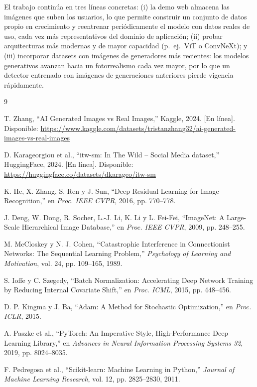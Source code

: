 \documentclass[conference]{IEEEtran}
\begin{document}
El trabajo continúa en tres líneas concretas: (i) la demo web almacena las imágenes que suben los usuarios, lo que permite construir un conjunto de datos propio en crecimiento y reentrenar periódicamente el modelo con datos reales de uso, cada vez más representativos del dominio de aplicación; (ii) probar arquitecturas más modernas y de mayor capacidad (p.\ ej.\ ViT o ConvNeXt); y (iii) incorporar datasets con imágenes de generadores más recientes: los modelos generativos avanzan hacia un fotorrealismo cada vez mayor, por lo que un detector entrenado con imágenes de generaciones anteriores pierde vigencia rápidamente.

\begin{thebibliography}{9}

T. Zhang, ``AI Generated Images vs Real Images,'' Kaggle, 2024. [En línea]. Disponible: \url{https://www.kaggle.com/datasets/tristanzhang32/ai-generated-images-vs-real-images}

D. Karageorgiou et al., ``itw-sm: In The Wild -- Social Media dataset,'' HuggingFace, 2024. [En línea]. Disponible: \url{https://huggingface.co/datasets/dkarageo/itw-sm}

K. He, X. Zhang, S. Ren y J. Sun, ``Deep Residual Learning for Image Recognition,'' en \emph{Proc. IEEE CVPR}, 2016, pp. 770--778.

J. Deng, W. Dong, R. Socher, L.-J. Li, K. Li y L. Fei-Fei, ``ImageNet: A Large-Scale Hierarchical Image Database,'' en \emph{Proc. IEEE CVPR}, 2009, pp. 248--255.

M. McCloskey y N. J. Cohen, ``Catastrophic Interference in Connectionist Networks: The Sequential Learning Problem,'' \emph{Psychology of Learning and Motivation}, vol. 24, pp. 109--165, 1989.

S. Ioffe y C. Szegedy, ``Batch Normalization: Accelerating Deep Network Training by Reducing Internal Covariate Shift,'' en \emph{Proc. ICML}, 2015, pp. 448--456.

D. P. Kingma y J. Ba, ``Adam: A Method for Stochastic Optimization,'' en \emph{Proc. ICLR}, 2015.

A. Paszke et al., ``PyTorch: An Imperative Style, High-Performance Deep Learning Library,'' en \emph{Advances in Neural Information Processing Systems 32}, 2019, pp. 8024--8035.

F. Pedregosa et al., ``Scikit-learn: Machine Learning in Python,'' \emph{Journal of Machine Learning Research}, vol. 12, pp. 2825--2830, 2011.

\end{thebibliography}
\end{document}
